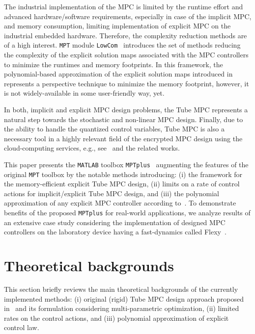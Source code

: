 \documentclass[letterpaper, 10 pt, conference]{ieeeconf}
\begin{document}
The industrial implementation of the MPC is limited by the runtime effort and advanced hardware/software requirements, especially in case of the implicit MPC, and memory consumption, limiting implementation of explicit MPC on the industrial embedded hardware. Therefore, the complexity reduction methods are of a high interest. 
\texttt{MPT} module \texttt{LowCom}~\cite{KH15} introduces the set of methods reducing the complexity of the explicit solution maps associated with the MPC controllers to minimize the runtimes and memory footprints. 
In this framework, the polynomial-based approximation of the explicit solution maps introduced in~\cite{KL11} represents a perspective technique to minimize the memory footprint, however, it is not widely-available in some user-friendly way, yet.

In both, implicit and explicit MPC design problems, the Tube MPC represents a natural step towards the stochastic and non-linear MPC design. Finally, due to the ability to handle the quantized control variables, Tube MPC is also a necessary tool in a highly relevant field of the encrypted MPC design using the cloud-computing services, e.g., see~\cite{DR18} and the related works.

This paper presents the \texttt{MATLAB} toolbox \texttt{MPTplus}~\cite{MPTplus} augmenting the features of the original \texttt{MPT} toolbox by the notable methods introducing: (i) the framework for the memory-efficient explicit Tube MPC design, (ii) limits on a rate of control actions for implicit/explicit Tube MPC design, and (iii) the polynomial approximation of any explicit MPC controller according to~\cite{KL11}. To demonstrate benefits of the proposed \texttt{MPTplus} for real-world applications, we analyze results of an extensive case study considering the implementation of designed MPC controllers on the laboratory device having a fast-dynamics called Flexy~\cite{CK19}. 

\section{Theoretical backgrounds}
\label{sec:tube_mpc_theory}

This section briefly reviews the main theoretical backgrounds of the currently implemented methods: (i) original (rigid) Tube MPC design approach proposed in~\cite{MS05} and its formulation considering multi-parametric optimization, (ii) limited rates on the control actions, and (iii) polynomial approximation of explicit control law.
\end{document}

